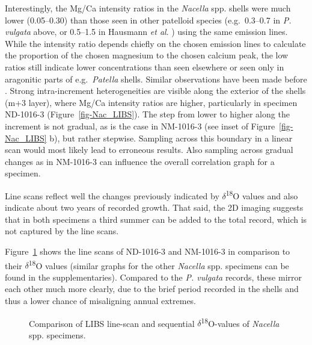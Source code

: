\documentclass[
  authoryear,
  preprint,
  3p]{elsarticle}
\begin{document}
Interestingly, the Mg/Ca intensity ratios in the \emph{Nacella} spp.
shells were much lower (0.05--0.30) than those seen in other patelloid
species (e.g.~0.3--0.7 in \emph{P. vulgata} above, or 0.5--1.5 in
Hausmann \emph{et al}. \citeyearpar{Hausmann2023-ih}) using the same
emission lines. While the intensity ratio depends chiefly on the chosen
emission lines to calculate the proportion of the chosen magnesium to
the chosen calcium peak, the low ratios still indicate lower
concentrations than seen elsewhere or seen only in aragonitic parts of
e.g.~\emph{Patella} shells. Similar observations have been made before
\citep{Graniero2017-io}. Strong intra-increment heterogeneities are
visible along the exterior of the shells (m+3 layer), where Mg/Ca
intensity ratios are higher, particularly in specimen ND-1016-3
(Figure~\ref{fig-Nac_LIBS}). The step from lower to higher along the
increment is not gradual, as is the case in NM-1016-3 (see inset of
Figure~\ref{fig-Nac_LIBS} b), but rather stepwise. Sampling across this
boundary in a linear scan would most likely lead to erroneous results.
Also sampling across gradual changes as in NM-1016-3 can influence the
overall correlation graph for a specimen.

Line scans reflect well the changes previously indicated by
\(\delta\)\textsuperscript{18}O values and also indicate about two years
of recorded growth. That said, the 2D imaging suggests that in both
specimens a third summer can be added to the total record, which is not
captured by the line scans.

Figure~\ref{fig-Nac_Comp} shows the line scans of ND-1016-3 and
NM-1016-3 in comparison to their \(\delta\)\textsuperscript{18}O values
(similar graphs for the other \emph{Nacella} spp. specimens can be found
in the supplementaries). Compared to the \emph{P. vulgata} records,
these mirror each other much more clearly, due to the brief period
recorded in the shells and thus a lower chance of misaligning annual
extremes.

\begin{figure}


\caption{\label{fig-Nac_Comp}Comparison of LIBS line-scan and sequential
\(\delta\)\textsuperscript{18}O-values of \emph{Nacella} spp.
specimens.}

\end{figure}%
\end{document}

